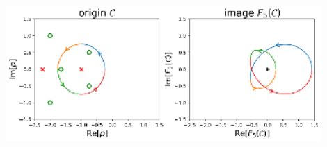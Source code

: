 \begin{center}
    \includegraphics[width=0.9\textwidth]{notebook/fig/output_45_2.eps}
\end{center}
